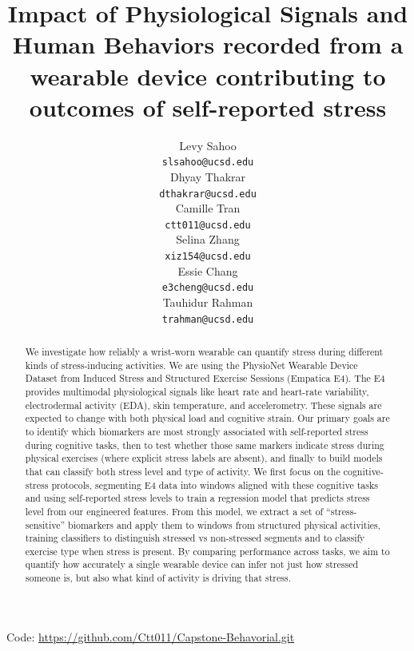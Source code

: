 \documentclass[12pt,letterpaper]{article}
\title{Impact of Physiological Signals and Human Behaviors recorded from a wearable device contributing to outcomes of self-reported stress}
\author{Levy Sahoo \\
  {\tt slsahoo@ucsd.edu} \\\And
  Dhyay Thakrar \\
  {\tt dthakrar@ucsd.edu} \\\And
  Camille Tran \\
  {\tt ctt011@ucsd.edu} \\\And
  Selina Zhang \\
  {\tt xiz154@ucsd.edu} \\\And
  Essie Chang \\
  {\tt e3cheng@ucsd.edu} \\\And
  Tauhidur Rahman \\
  {\tt trahman@ucsd.edu} \\}
\begin{document}
\maketitle



\begin{abstract}
    
    {We investigate how reliably a wrist-worn wearable can quantify stress during different kinds of stress-inducing activities. We are using the PhysioNet Wearable Device Dataset from Induced Stress and Structured Exercise Sessions (Empatica E4). The E4 provides multimodal physiological signals like heart rate and heart-rate variability, electrodermal activity (EDA), skin temperature, and accelerometry. These signals are expected to change with both physical load and cognitive strain. Our primary goals are to identify which biomarkers are most strongly associated with self-reported stress during cognitive tasks, then to test whether those same markers indicate stress during physical exercises (where explicit stress labels are absent), and finally to build models that can classify both stress level and type of activity. We first focus on the cognitive-stress protocols, segmenting E4 data into windows aligned with these cognitive tasks and using self-reported stress levels to train a regression model that predicts stress level from our engineered features. From this model, we extract a set of “stress-sensitive” biomarkers and apply them to windows from structured physical activities, training classifiers to distinguish stressed vs non-stressed segments and to classify exercise type when stress is present. By comparing performance across tasks, we aim to quantify how accurately a single wearable device can infer not just how stressed someone is, but also what kind of activity is driving that stress.}
\end{abstract}

\begin{center}
Code: \url{https://github.com/Ctt011/Capstone-Behavorial.git}
\end{center}


\clearpage

\maketoc

\end{document}
